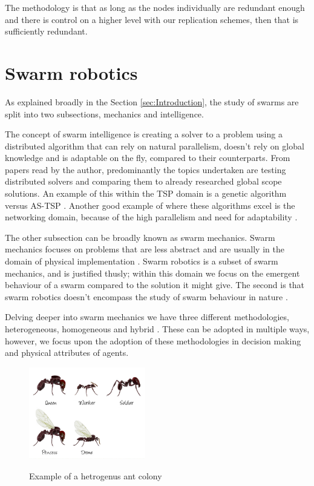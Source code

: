 \documentclass{UoYCSproject}
\begin{document}
The methodology is that as long as the nodes individually are redundant enough and there is control on a higher level with our replication schemes, then that is sufficiently redundant.



\section{Swarm robotics}
\label{sec:Robotics}

As explained broadly in the Section \ref{sec:Introduction}, the study of swarms are split into two subsections, mechanics and intelligence.

The concept of swarm intelligence is creating a solver to a problem using a distributed algorithm that can rely on natural parallelism, doesn't rely on global knowledge and is adaptable on the fly, compared to their counterparts.
From papers read by the author, predominantly the topics undertaken are testing distributed solvers and comparing them to already researched global scope solutions.
An example of this within the TSP domain is a genetic algorithm versus AS-TSP \cite{Swarm intellegiegence}.
Another good example of where these algorithms excel is the networking domain, because of the high parallelism and need for adaptability \cite{Swarm intellegiegence}.

The other subsection can be broadly known as swarm mechanics.
Swarm mechanics focuses on problems that are less abstract and are usually in the domain of physical implementation \cite{Cognitive maps mine detection, Probabalitic automata foraging robots}.
Swarm robotics is a subset of swarm mechanics, and is justified thusly; within this domain we focus on the emergent behaviour of a swarm compared to the solution it might give.
The second is that swarm robotics doesn’t encompass the study of swarm behaviour in nature \cite{Swarm intellegiegence, Ant communication}.

Delving deeper into swarm mechanics we have three different methodologies, heterogeneous, homogeneous and hybrid \cite{Swarm robotics reviewed}.
These can be adopted in multiple ways, however, we focus upon the adoption of these methodologies in decision making and physical attributes of agents.

\begin{figure}[htb]
\begin{center}
\label{fig:anthero}
\includegraphics[height=4cm]{"./ExplanationImgs/AntHetro.png"}
\end{center}
\caption{Example of a hetrogenus ant colony}
\end{figure}
\end{document}
